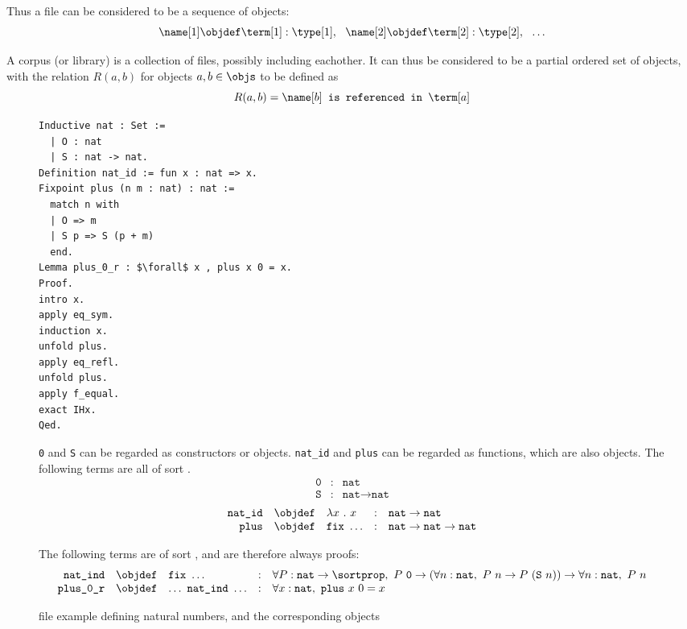 Thus a \coq file can be considered to be a sequence of \coq objects:
$$ \name[1] \objdef \term[1] : \type[1], ~~ \name[2] \objdef \term[2] : \type[2], ~~ \ldots $$

A \coq corpus (or library) is a collection of \coq files, possibly including eachother.
It can thus be considered to be a partial ordered set of \coq objects, with the relation $R(a,b)$ for \coq objects $a, b \in \objs$ to be defined as
\[R(a,b) = \name[b] \texttt{~is referenced in~} \term[a]\]

\begin{figure}[H]
	\begin{lstlisting}[language=Coq, mathescape]
Inductive nat : Set :=
  | O : nat
  | S : nat -> nat.
Definition nat_id := fun x : nat => x.
Fixpoint plus (n m : nat) : nat :=
  match n with
  | O => m
  | S p => S (p + m)
  end.
Lemma plus_0_r : $\forall$ x , plus x 0 = x.
Proof.
intro x.
apply eq_sym.
induction x.
unfold plus.
apply eq_refl.
unfold plus.
apply f_equal.
exact IHx.
Qed.
	\end{lstlisting}
	\texttt{0} and \texttt{S} can be regarded as constructors or objects. \texttt{nat\_id} and \texttt{plus} can be regarded as functions, which are also objects.
	The following terms are all of sort \sortset.
	$$
		\begin{array}{rcl}
			\texttt{0} & : & \texttt{nat} \\
			\texttt{S} & : & \texttt{nat} \rightarrow \texttt{nat}
		\end{array}
	$$
	$$
		\begin{array}{rclcl}
			\texttt{nat\_id} & \objdef & \lambda x~.~x & : & \texttt{nat} \rightarrow \texttt{nat} \\
			\texttt{plus} & \objdef & \texttt{fix}~\ldots & : & \texttt{nat} \rightarrow \texttt{nat} \rightarrow \texttt{nat} \\
		\end{array}
	$$

	The following terms are of sort \sortprop, and are therefore always proofs:
	$$
		\begin{array}{rclcl}
			\texttt{nat\_ind} & \objdef & \texttt{fix}~\ldots & : &
				\forall P : \texttt{nat} \rightarrow \sortprop,~
				P~\texttt{0} \rightarrow (\forall n : \texttt{nat},~ P~n \rightarrow P~(\texttt{S}~n)) \rightarrow \forall n : \texttt{nat},~ P~n \\
			\texttt{plus\_0\_r} & \objdef & \ldots~\texttt{nat\_ind}~\ldots & : & \forall x : \texttt{nat},~ \texttt{plus}~x~0 = x
		\end{array}
	$$
	\caption{\coq file example defining natural numbers, and the corresponding \coq objects}
	\label{figure:natexample}
\end{figure}
